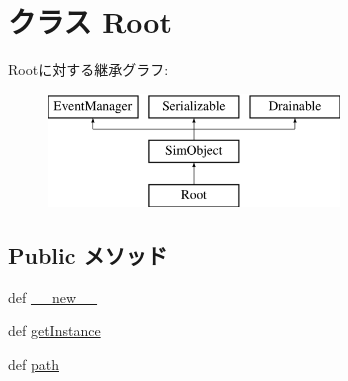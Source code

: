 \hypertarget{classRoot_1_1Root}{
\section{クラス Root}
\label{classRoot_1_1Root}
}
Rootに対する継承グラフ:\begin{figure}[H]
\begin{center}
\leavevmode
\includegraphics[height=3cm]{classRoot_1_1Root}
\end{center}
\end{figure}
\subsection*{Public メソッド}
\begin{DoxyCompactItemize}
\item 
def \hyperlink{classRoot_1_1Root_a2f15a4676204349e06bcced484b06b70}{\_\-\_\-new\_\-\_\-}
\item 
def \hyperlink{classRoot_1_1Root_a6ca8e60d546903376be2d1eca9b90a7f}{getInstance}
\item 
def \hyperlink{classRoot_1_1Root_a4767b0796ffc0da267b28b3f24776d97}{path}
\end{DoxyCompactItemize}
